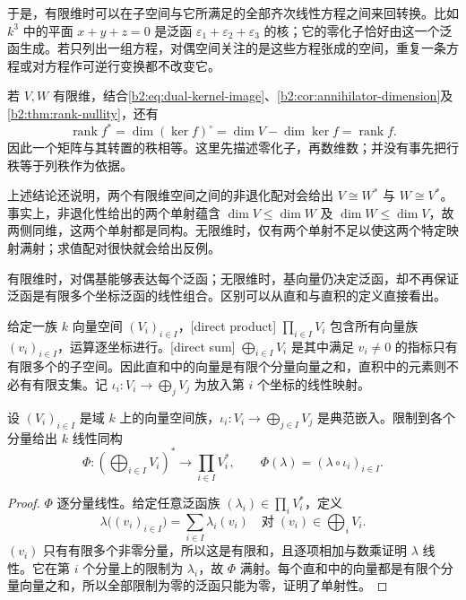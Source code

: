于是，有限维时可以在子空间与它所满足的全部齐次线性方程之间来回转换。比如 \(k^3\) 中的平面 \(x+y+z=0\) 是泛函 \(\varepsilon_1+\varepsilon_2+\varepsilon_3\) 的核；它的零化子恰好由这一个泛函生成。若只列出一组方程，对偶空间关注的是这些方程张成的空间，重复一条方程或对方程作可逆行变换都不改变它。

\ProseParagraphBreak
若 \(V,W\) 有限维，结合\eqref{b2:eq:dual-kernel-image}、\cref{b2:cor:annihilator-dimension}及\cref{b2:thm:rank-nullity}，还有
\[
	\operatorname{rank}f^* =\dim(\ker f)^\circ =\dim V-\dim\ker f =\operatorname{rank}f.
\]
因此一个矩阵与其转置的秩相等。这里先描述零化子，再数维数；并没有事先把行秩等于列秩作为依据。

\ProseParagraphBreak
上述结论还说明，两个有限维空间之间的非退化配对会给出 \(V\cong W^*\) 与 \(W\cong V^*\)。事实上，非退化性给出的两个单射蕴含 \(\dim V\le\dim W\) 及 \(\dim W\le\dim V\)，故两侧同维，这两个单射都是同构。无限维时，仅有两个单射不足以使这两个特定映射满射；求值配对很快就会给出反例。

\ProseParagraphBreak
有限维时，对偶基能够表达每个泛函；无限维时，基向量仍决定泛函，却不再保证泛函是有限多个坐标泛函的线性组合。区别可以从直和与直积的定义直接看出。

\ProseParagraphBreak
给定一族 \(k\) 向量空间 \((V_i)_{i\in I}\)，[direct product] \(\prod_{i\in I}V_i\) 包含所有向量族 \((v_i)_{i\in I}\)，运算逐坐标进行。[direct sum] \(\bigoplus_{i\in I}V_i\) 是其中满足 \(v_i\ne0\) 的指标只有有限多个的子空间。因此直和中的向量是有限个分量向量之和，直积中的元素则不必有有限支集。记 \(\iota_i:V_i\to\bigoplus_jV_j\) 为放入第 \(i\) 个坐标的线性映射。

\begin{proposition}[直和的对偶]\label{b2:prop:dual-direct-sum}
	设 \((V_i)_{i\in I}\) 是域 \(k\) 上的向量空间族，\(\iota_i:V_i\to\bigoplus_{j\in I}V_j\) 是典范嵌入。限制到各个分量给出 \(k\) 线性同构
	\[
		\Phi:\left(\bigoplus_{i\in I}V_i\right)^* \longrightarrow\prod_{i\in I}V_i^*, \qquad \Phi(\lambda)=(\lambda\circ\iota_i)_{i\in I}.
	\]
\end{proposition}

\begin{proof}
	\(\Phi\) 逐分量线性。给定任意泛函族 \((\lambda_i)\in\prod_iV_i^*\)，定义
	\[
		\lambda\bigl((v_i)_{i\in I}\bigr)=\sum_{i\in I}\lambda_i(v_i) \quad\text{对}\;(v_i)\in\bigoplus_iV_i.
	\]
	\((v_i)\) 只有有限多个非零分量，所以这是有限和，且逐项相加与数乘证明 \(\lambda\) 线性。它在第 \(i\) 个分量上的限制为 \(\lambda_i\)，故 \(\Phi\) 满射。每个直和中的向量都是有限个分量向量之和，所以全部限制为零的泛函只能为零，证明了单射性。
\end{proof}


